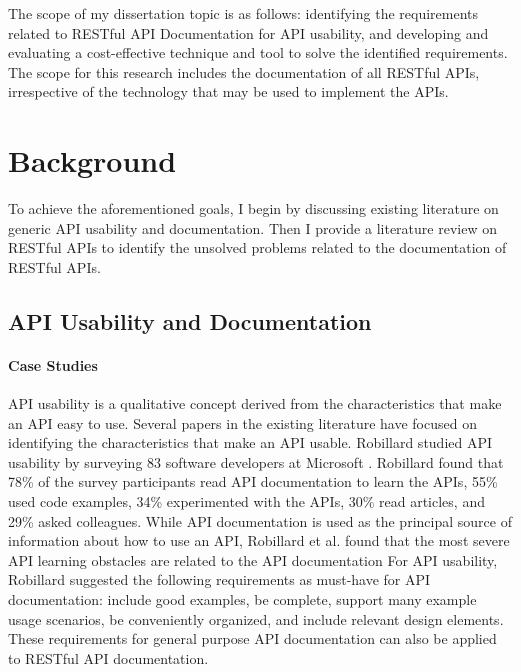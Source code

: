 \documentclass[11pt,oneside]{book}
\begin{document}
The scope of my dissertation topic is as follows: identifying the requirements related to RESTful API Documentation for API usability, and developing and evaluating a cost-effective technique and tool to solve the identified requirements. The scope for this research includes the documentation of all RESTful APIs, irrespective of the technology that may be used to implement the APIs.

\chapter{Background}

To achieve the aforementioned goals, I begin by discussing existing literature on generic API usability and documentation. Then I provide a literature review on RESTful APIs to identify the unsolved problems related to the documentation of RESTful APIs.


\section{API Usability and Documentation}

\subsubsection{Case Studies} %
\label{ssub:case_studies}


API usability is a qualitative concept derived from the characteristics that make an API easy to use. Several papers in the existing literature have focused on identifying the characteristics that make an API usable. Robillard studied API usability by surveying 83 software developers at Microsoft \cite{Robillard_a_field_study}. Robillard found that 78\% of the survey participants read API documentation to learn the APIs, 55\% used code examples, 34\% experimented with the APIs, 30\% read articles, and 29\% asked colleagues. While API documentation is used as the principal source of information about how to use an API, Robillard et al. found that the most severe API learning obstacles are related to the API documentation For API usability, Robillard suggested the following requirements as must-have for API documentation: include good examples, be complete, support many example usage scenarios, be conveniently organized, and include relevant design elements. These requirements for general purpose API documentation can also be applied to RESTful API documentation.
\end{document}
